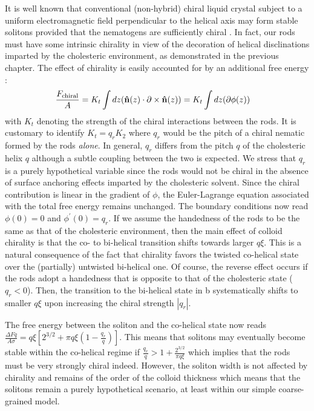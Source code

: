 It is well known that conventional (non-hybrid) chiral liquid crystal subject to a uniform electromagnetic field perpendicular to the helical axis may form stable solitons provided that the nematogens are sufficiently chiral \cite{lam2012solitons,ackerman2014two,wu2022hopfions}.  In fact, our rods must have some intrinsic chirality in view of the decoration of helical disclinations imparted by the cholesteric environment, as demonstrated in the previous chapter. The effect of chirality is easily accounted for by an additional free energy \cite{gennes-prost}:
\begin{align}
\frac{F_{\rm chiral}}{A} &= K_{t} \int d z  ({\bf \hat{n}}(z) \cdot \partial \times {\bf \hat{n}}(z) )=  K_{t} \int d z (\partial \phi(z) )
\end{align}
with $K_{t}$ denoting the strength of the chiral interactions between the rods. It is customary to identify $K_{t} =q_{r} K_{2}$ where $q_{r}$ would be the pitch of a chiral nematic formed by the rods {\em alone}. In general, $q_{r}$ differs from the pitch $q$ of the cholesteric helix $q$ although a subtle coupling between the two is expected. We stress that $q_{r}$  is a purely hypothetical variable since the rods would not be chiral in the absence of surface anchoring effects imparted by the cholesteric solvent.
Since the chiral contribution is linear in the gradient of $\phi$, the Euler-Lagrange equation  associated with the total free energy remains unchanged. The boundary conditions now read $\phi(0) = 0$ and $\phi^{\prime}(0) = q_{r}$. If we assume the handedness of the rods to be the same as that of the cholesteric environment, then the main effect of colloid chirality is that the co- to bi-helical transition shifts towards larger $q \xi$. This is a natural consequence of the fact that chirality favors the twisted co-helical state over the (partially) untwisted bi-helical one. Of course, the reverse effect occurs if the rods adopt a handedness that is opposite to that of the cholesteric state ($q_{r} <0$). Then, the transition to the bi-helical state in b systematically shifts to smaller $q\xi$ upon increasing the chiral strength $|q_{r}|$.


The free energy between the soliton and the  co-helical state now reads $ \tfrac{\Delta Fq}{ A \sigma} = q \xi [ 2^{3/2}+  \pi q \xi (1-\tfrac{q_{r}}{q})]$. This means that solitons may eventually become stable within the co-helical regime if $\tfrac{q_{r}}{q} > 1 + \tfrac{2^{3/2}}{\pi q \xi}$ which implies that the rods must be very strongly chiral indeed. However, the soliton width is not affected by chirality and remains of the order of the colloid thickness which means that the solitons remain a purely hypothetical scenario, at least within our simple coarse-grained model.

